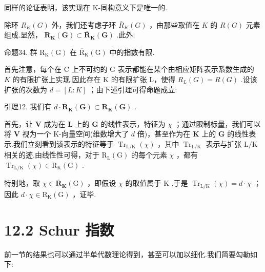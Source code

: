 \documentclass[10pt]{article}
\begin{document}
同样的论证表明，该实现在 K-同构意义下是唯一的.

除环 \({R}_{K}\left( G\right)\) 外，我们还考虑子环 \({\bar{R}}_{K}\left( G\right)\) ，由那些取值在 \(K\) 的 \(R\left( G\right)\) 元素组成.显然， \({\mathbf{R}}_{\mathbf{K}}\left( \mathbf{G}\right)  \subset  {\overline{\mathbf{R}}}_{\mathbf{K}}\left( \mathbf{G}\right)\) .此外:

命题34. 群 \({\mathrm{R}}_{\mathrm{K}}\left( \mathrm{G}\right)\) 在 \({\overline{\mathrm{R}}}_{\mathrm{K}}\left( \mathrm{G}\right)\) 中的指数有限.

首先注意，每个在 C 上不可约的 G 表示都能在某个由相应矩阵表示系数生成的 \(K\) 的有限扩张上实现.因此存在 K 的有限扩张 L，使得 \({R}_{L}\left( G\right)  = R\left( G\right)\) .设该扩张的次数为 \(d = \left\lbrack  {L : K}\right\rbrack\) ；由下述引理可得命题成立:

引理12. 我们有 \(d \cdot  {\overline{\mathbf{R}}}_{\mathbf{K}}\left( \mathbf{G}\right)  \subset  {\mathbf{R}}_{\mathbf{K}}\left( \mathbf{G}\right)\) .

首先，让 \(\mathbf{V}\) 成为在 \(\mathbf{L}\) 上的 \(\mathbf{G}\) 的线性表示，特征为 \(\chi\) ；通过限制标量，我们可以将 \(\mathbf{V}\) 视为一个 K-向量空间(维数增大了 \(d\) 倍)，甚至作为在 \(\mathbf{K}\) 上的 \(\mathbf{G}\) 的线性表示.我们立刻看到该表示的特征等于 \({\operatorname{Tr}}_{\mathrm{L}/\mathrm{K}}\left( \chi \right)\) ，其中 \({\operatorname{Tr}}_{\mathrm{L}/\mathrm{K}}\) 表示与扩张 \(\mathrm{L}/\mathrm{K}\) 相关的迹.由线性性可得，对于 \({\mathrm{R}}_{\mathrm{L}}\left( \mathrm{G}\right)\) 的每个元素 \(\chi\) ，都有 \({\operatorname{Tr}}_{\mathrm{L}/\mathrm{K}}\left( \chi \right)  \in  {\mathrm{R}}_{\mathrm{K}}\left( \mathrm{G}\right)\) .

特别地，取 \(\chi  \in  {\overline{\mathbf{R}}}_{\mathbf{K}}\left( \mathrm{G}\right)\) ，即假设 \(\chi\) 的取值属于 \(\mathrm{K}\) .于是 \({\operatorname{Tr}}_{\mathrm{L}/\mathrm{K}}\left( \chi \right)  = d \cdot  \chi\) ；因此 \(d \cdot  \chi  \in  {\mathrm{R}}_{\mathrm{K}}\left( \mathrm{G}\right)\) ，证毕.

\section*{12.2 Schur 指数}

前一节的结果也可以通过半单代数理论得到，甚至可以加以细化.我们简要勾勒如下:
\end{document}
